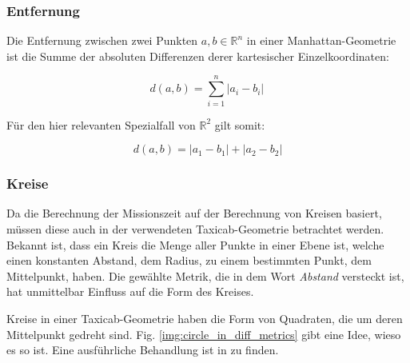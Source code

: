 \documentclass{article}
\begin{document}
\subsubsection{Entfernung}

Die Entfernung zwischen zwei Punkten $a, b \in \mathbb{R}^n$ in einer Manhattan-Geometrie ist die Summe 
der absoluten Differenzen derer kartesischer Einzelkoordinaten:

\begin{equation*}
d(a,b)=\sum_{i=1}^n \left|a_i-b_i\right|\,
\end{equation*}

Für den hier relevanten Spezialfall von $\mathbb{R}^2$ gilt somit:

\begin{equation*}
d(a,b)=|a_1-b_1|+|a_2-b_2|
\end{equation*}

\subsubsection{Kreise}

Da die Berechnung der Missionszeit auf der Berechnung von Kreisen basiert, müssen diese auch in der verwendeten
Taxicab-Geometrie betrachtet werden. Bekannt ist, dass ein Kreis die Menge aller Punkte in einer Ebene ist,
welche einen konstanten Abstand, dem Radius, zu einem bestimmten Punkt, dem Mittelpunkt, haben. Die gewählte Metrik, 
die in dem Wort \textit{Abstand} versteckt ist, hat unmittelbar Einfluss auf die Form des Kreises.

Kreise in einer Taxicab-Geometrie haben die Form von Quadraten, die \unit[45]{\textdegree} um deren 
Mittelpunkt gedreht sind. Fig. \ref{img:circle_in_diff_metrics} gibt eine Idee, wieso es so ist. Eine 
ausführliche Behandlung ist in \cite{janssen2007} zu finden.
\end{document}
